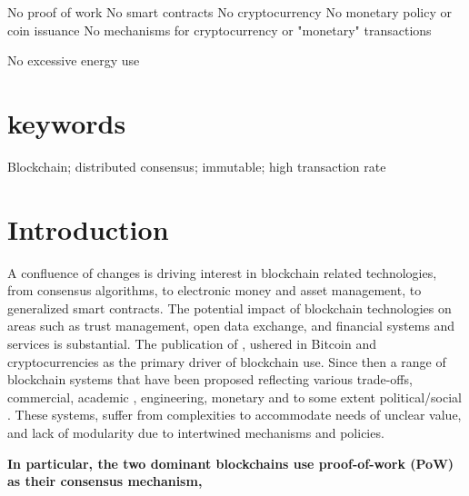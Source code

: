 \documentclass[10pt]{article}
\begin{document}
No proof of work
No smart contracts
No cryptocurrency
No monetary policy or coin issuance
No mechanisms for cryptocurrency or "monetary" transactions

No excessive energy use



\section*{keywords} 
Blockchain; distributed consensus; immutable; high transaction rate

\vspace{.12 in}


\newpage

\tableofcontents

\newpage

\setcounter{page}{1}

\section{Introduction}
 
A confluence of changes is driving interest in blockchain related technologies, from consensus algorithms, to electronic money and asset management, to generalized smart contracts. The potential impact of blockchain technologies on areas such as trust management, open data exchange, and financial systems and services is substantial. The publication of \cite{satoshi-paper}, ushered in Bitcoin and cryptocurrencies as the primary driver of blockchain use. Since then a range of blockchain systems that have been proposed reflecting various trade-offs, commercial, academic , engineering, monetary and to some extent political/social \cite{satoshi-paper, hyperledger, ethereum}. These systems, suffer from complexities to accommodate needs of unclear value, and lack of modularity due to intertwined mechanisms and policies. 

\textbf{In particular, the two dominant blockchains \cite{satoshi-paper, ethereum} use proof-of-work (PoW) as their consensus mechanism,   }
\end{document}
